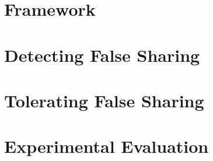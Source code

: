 \section{\sheriff{} Framework}


\section{Detecting False Sharing}


\section{Tolerating False Sharing}


\section{Experimental Evaluation}


